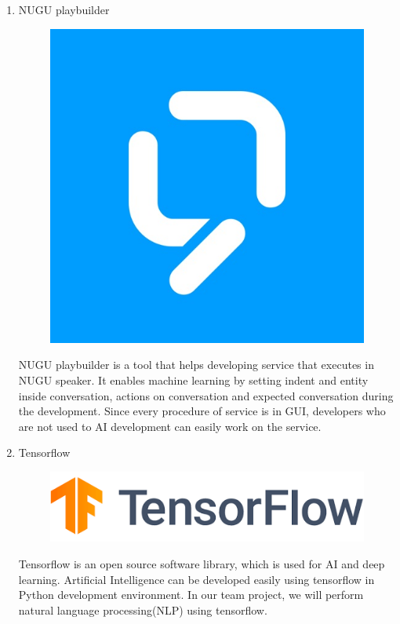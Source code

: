 \documentclass[conference]{IEEEtran}
\begin{document}
\begin{enumerate}
\begin{enumerate}
        \newpage
        \item NUGU playbuilder
        \begin{figure}[H]
                 \centering
                 \includegraphics[scale=0.15]{new_assets/nugu-logo.jpg}
                 \end{figure}
        NUGU playbuilder is a tool that helps developing service that executes in NUGU speaker. It enables machine learning by setting indent and entity inside conversation, actions on conversation and expected conversation during the development. Since every procedure of service is in GUI, developers who are not used to AI development can easily work on the service.\\
        \item Tensorflow
        \begin{figure}[H]
                 \centering
                 \includegraphics[scale=0.3]{new_assets/tensorflow-logo.png}
                 \end{figure}
        Tensorflow is an open source software library, which is used for AI and deep learning. Artificial Intelligence can be developed easily using tensorflow in Python development environment. In our team project, we will perform natural language processing(NLP) using tensorflow.\\

\end{enumerate}
\end{enumerate}
\end{document}
